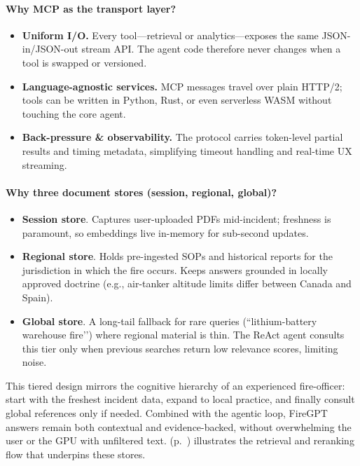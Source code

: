 \documentclass[lang=english,inputenc=utf8,fontsize=10pt]{ldvarticle}
\begin{document}
\paragraph{Why MCP as the transport layer?}
\vspace{-0.2\baselineskip}
\begin{itemize}
  \item \textbf{Uniform I/O.}  Every tool—retrieval or analytics—exposes the
        same JSON-in/JSON-out stream API.  The agent code therefore never
        changes when a tool is swapped or versioned.
  \item \textbf{Language-agnostic services.}  MCP messages travel over plain
        HTTP/2; tools can be written in Python, Rust, or even serverless
        WASM without touching the core agent.
  \item \textbf{Back-pressure \& observability.}  The protocol carries
        token-level partial results and timing metadata, simplifying
        timeout handling and real-time UX streaming.
\end{itemize}

\paragraph{Why three document stores (session, regional, global)?}
\vspace{-0.2\baselineskip}
\begin{itemize}
  \item \textbf{Session store}.  Captures user-uploaded PDFs mid-incident;
        freshness is paramount, so embeddings live in-memory for
        sub-second updates.
  \item \textbf{Regional store}.  Holds pre-ingested SOPs and historical
        reports for the jurisdiction in which the fire occurs.  Keeps
        answers grounded in locally approved doctrine (e.g., air-tanker
        altitude limits differ between Canada and Spain).
  \item \textbf{Global store}.  A long-tail fallback for rare queries
        (``lithium-battery warehouse fire’’) where regional material is
        thin.  The ReAct agent consults this tier only when previous
        searches return low relevance scores, limiting noise.
\end{itemize}

This tiered design mirrors the cognitive hierarchy of an experienced
fire-officer: start with the freshest incident data, expand to local
practice, and finally consult global references only if needed.  Combined
with the agentic loop, FireGPT answers remain both contextual and
evidence-backed, without overwhelming the user or the GPU with
unfiltered text.    (p.~\pageref{fig:retrieval})
illustrates the retrieval and reranking flow that underpins these stores.
\end{document}
